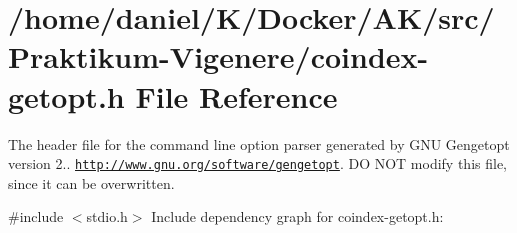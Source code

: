 \hypertarget{coindex-getopt_8h}{}\section{/home/daniel/\+K/\+Docker/\+A\+K/src/\+Praktikum-\/\+Vigenere/coindex-\/getopt.h File Reference}
\label{coindex-getopt_8h}


The header file for the command line option parser generated by G\+NU Gengetopt version 2.. \href{http://www.gnu.org/software/gengetopt}{\tt http\+://www.\+gnu.\+org/software/gengetopt}. DO N\+OT modify this file, since it can be overwritten.  


{\ttfamily \#include $<$stdio.\+h$>$}\newline
Include dependency graph for coindex-\/getopt.h\+:
